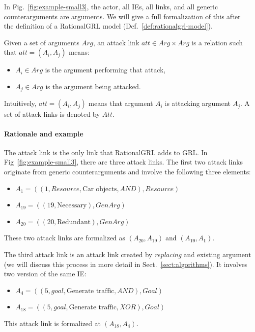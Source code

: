 In Fig.~\ref{fig:example-small3}, the actor, all IEs, all links, and all generic counterarguments are arguments. We will give a full formalization of this after the definition of a RationalGRL model (Def.~\ref{def:rationalgrl-model}).

\begin{definition}
\label{def:link:attack}
Given a set of arguments $Arg$, an attack link $att\in Arg\times Arg$ is a relation such that $att=(A_i,A_j)$ means:
\begin{itemize}
\item $A_i\in Arg$ is the argument performing that attack,
\item $A_j\in Arg$ is the argument being attacked.
\end{itemize}
Intuitively, $att=(A_i,A_j)$ means that argument $A_i$ is attacking argument $A_j$. A set of attack links is denoted by $Att$.
\end{definition}

\paragraph{Rationale and example} The attack link is the only link that RationalGRL adds to GRL. In Fig~\ref{fig:example-small3}, there are three attack links. The first two attack links originate from generic counterarguments and involve the following three elements:
\begin{itemize}
\item $A_1 = ((1, Resource, \text{Car objects}, AND), Resource)$
\item $A_{19} = ((19, \text{Necessary}), GenArg)$
\item $A_{20} = ((20, \text{Redundant}), GenArg)$
\end{itemize}

These two attack links are formalized as $(A_{20},A_{19})$ and $(A_{19}, A_1)$.

The third attack link is an attack link created by \emph{replacing} and existing argument (we will discuss this process in more detail in Sect.~\ref{sect:algorithms}). It involves two version of the same IE:
\begin{itemize}
\item $A_{4} = ((5, goal, \text{Generate traffic}, AND), Goal)$
\item $A_{18} = ((5, goal, \text{Generate traffic}, XOR), Goal)$
\end{itemize}

This attack link is formalized at $(A_{18},A_4)$.

